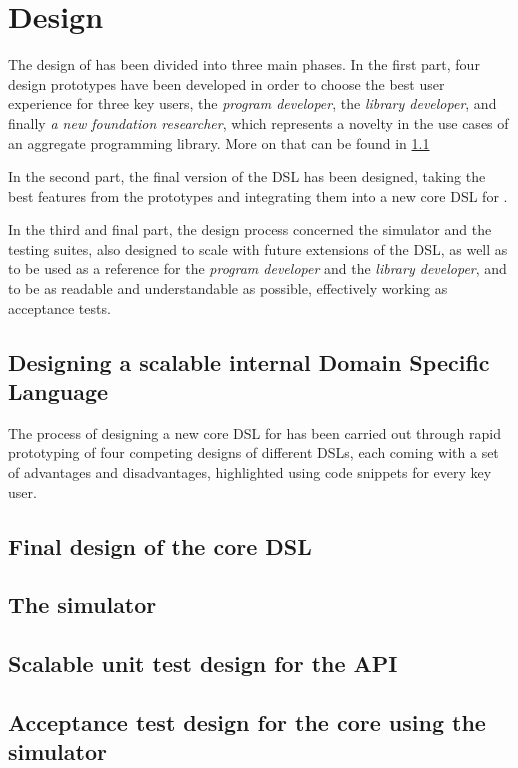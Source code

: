 \chapter{Design}
\label{chap:design}
The design of \this has been divided into three main phases.
%
In the first part, four design prototypes have been developed in order to choose the best user experience for three key users, the \textit{program developer}, the \textit{library developer}, and finally \textit{a new foundation researcher}, which represents a novelty in the use cases of an aggregate programming library.
%
More on that can be found in \cref{chap:design->sec:dsl}

In the second part, the final version of the \ac{DSL} has been designed, taking the best features from the prototypes and integrating them into a new core \ac{DSL} for \this.

In the third and final part, the design process concerned the simulator and the testing suites, also designed to scale with future extensions of the \ac{DSL}, as well as to be used as a reference for the \textit{program developer} and the \textit{library developer}, and to be as readable and understandable as possible, effectively working as acceptance tests.

\section{Designing a scalable internal Domain Specific Language} \label{chap:design->sec:dsl}

The process of designing a new core \ac{DSL} for \this has been carried out through rapid prototyping of four competing designs of different \acp{DSL}, each coming with a set of advantages and disadvantages, highlighted using code snippets for every key user.


\section{Final design of the core DSL}

\section{The simulator}

\section{Scalable unit test design for the API}

\section{Acceptance test design for the core using the simulator}
